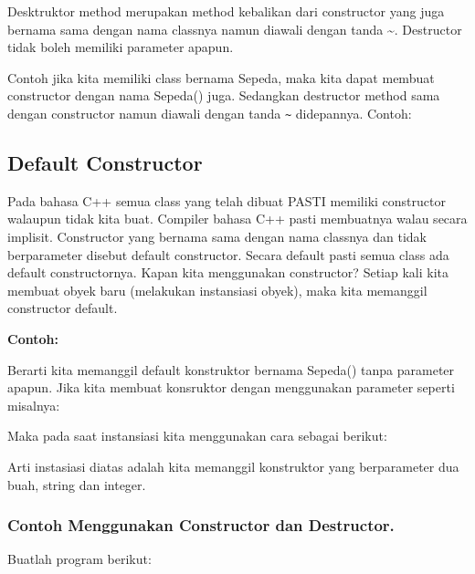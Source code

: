 Desktruktor method merupakan method kebalikan dari constructor yang juga
bernama sama dengan nama classnya namun diawali dengan tanda
\textasciitilde{}. Destructor tidak boleh memiliki parameter apapun.

Contoh jika kita memiliki class bernama Sepeda, maka kita dapat membuat
constructor dengan nama Sepeda() juga. Sedangkan destructor method sama
dengan constructor namun diawali dengan tanda \texttt{\textasciitilde{}}
didepannya. Contoh:



\subsection{Default Constructor}\label{default-constructor}

Pada bahasa C++ semua class yang telah dibuat PASTI memiliki constructor
walaupun tidak kita buat. Compiler bahasa C++ pasti membuatnya walau
secara implisit. Constructor yang bernama sama dengan nama classnya dan
tidak berparameter disebut default constructor. Secara default pasti
semua class ada default constructornya. Kapan kita menggunakan
constructor? Setiap kali kita membuat obyek baru (melakukan instansiasi
obyek), maka kita memanggil constructor default.

\textbf{Contoh:}



Berarti kita memanggil default konstruktor bernama Sepeda() tanpa
parameter apapun. Jika kita membuat konsruktor dengan menggunakan
parameter seperti misalnya:



Maka pada saat instansiasi kita menggunakan cara sebagai berikut:



Arti instasiasi diatas adalah kita memanggil konstruktor yang
berparameter dua buah, string dan integer.

\subsubsection*{Contoh Menggunakan Constructor dan Destructor.}

Buatlah program berikut:



